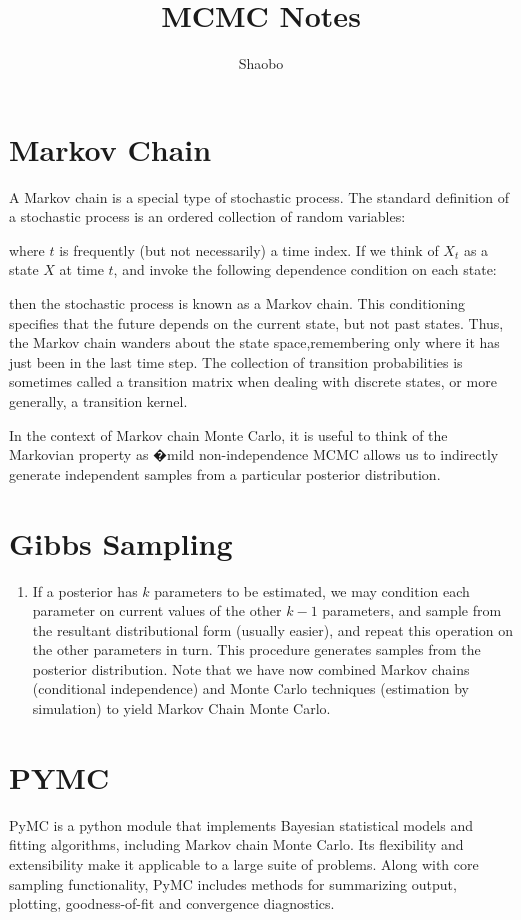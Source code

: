 \documentclass[a4paper,10pt]{article}
\title{MCMC Notes}
\author{Shaobo}
\begin{document}
\maketitle
\section{Markov Chain}
A Markov chain is a special type of stochastic process. The standard definition of a stochastic process is an ordered collection of 
random variables:



where $t$ is frequently (but not necessarily) a time index. If we think of $X_t$ as a state $X$ at time $t$, and invoke the following 
dependence condition on each state:



then the stochastic process is known as a Markov chain. This conditioning specifies that the future depends on the current state, but not 
past states. Thus, the Markov chain wanders about the state space,remembering only where it has just been in the last time step. The 
collection of transition probabilities is sometimes called a transition matrix when dealing with discrete states, or more generally, a
transition kernel.

In the context of Markov chain Monte Carlo, it is useful to think of the Markovian property as �mild non-independence MCMC allows us to 
indirectly generate independent samples from a particular posterior distribution.

\section{Gibbs Sampling}
\begin{enumerate}
 \item  If a posterior has $k$ parameters to be estimated, we may condition each parameter on current values of the other $k-1$ parameters,
 and sample from the resultant distributional form (usually easier), and repeat this operation on the other parameters in turn. This procedure
 generates samples from the posterior distribution. Note that we have now combined Markov chains (conditional independence) and Monte Carlo
 techniques (estimation by simulation) to yield Markov Chain Monte Carlo.
\end{enumerate}


\section{PYMC}
PyMC is a python module that implements Bayesian statistical models and
fitting algorithms, including Markov chain Monte Carlo. Its flexibility
and extensibility make it applicable to a large suite of problems. Along
with core sampling functionality, PyMC includes methods for summarizing
output, plotting, goodness-of-fit and convergence diagnostics.
\end{document}
